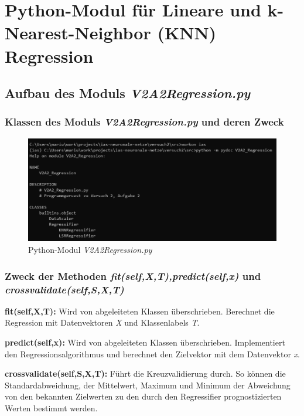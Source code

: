 \section{Python-Modul für Lineare und k-Nearest-Neighbor (KNN) Regression}


\subsection{
    Aufbau des Moduls \textit{V2A2\textunderscore Regression.py}
}

\subsubsection{ Klassen des Moduls \textit{V2A2\textunderscore Regression.py} und deren Zweck}

\begin{figure}[H]
    \centering
    \includegraphics[width=1\linewidth]{sections/v2a2_pydoc.png}
    \caption{Python-Modul \textit{V2A2\textunderscore Regression.py}}
\end{figure}

\subsubsection{ Zweck der Methoden \textit{fit(self,X,T),predict(self,x)} und \textit{crossvalidate(self,S,X,T)}}

\noindent
\textbf{fit(self,X,T):} Wird von abgeleiteten Klassen überschrieben. Berechnet die Regression mit Datenvektoren \textit{X} und Klassenlabels \textit{T}.

\vspace{5px}
\noindent
\textbf{predict(self,x):} Wird von abgeleiteten Klassen überschrieben. Implementiert den Regressionsalgorithmus und berechnet den Zielvektor mit dem Datenvektor \textit{x}.

\vspace{5px}
\noindent
\textbf{crossvalidate(self,S,X,T):} Führt die Kreuzvalidierung durch. So können die Standardabweichung, der Mittelwert, Maximum und Minimum der Abweichung von den bekannten Zielwerten zu den durch den Regressifier prognostizierten Werten bestimmt werden. 


